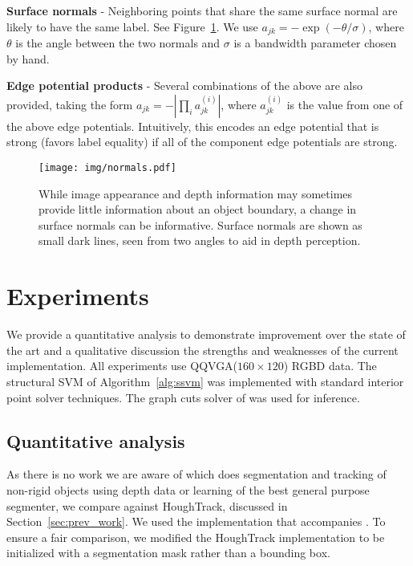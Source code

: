 \documentclass[graybox]{svmult}
\newcommand{\qqvga}{QQVGA\xspace}
\begin{document}
\textbf{Surface normals} - Neighboring points that share the same surface normal are likely to have the same label.  See Figure~\ref{fig:normals}. We use $a_{jk} = - \exp(-\theta / \sigma)$, where $\theta$ is the angle between the two normals and $\sigma$ is a bandwidth parameter chosen by hand.

\textbf{Edge potential products} - Several combinations of the above are also provided, taking the form $a_{jk} = -|\prod_i a^{(i)}_{jk}|$, where $a^{(i)}_{jk}$ is the value from one of the above edge potentials.  Intuitively, this encodes an edge potential that is strong (\ie favors label equality) if all of the component edge potentials are strong.

\begin{figure}
  \texttt{[image: img/normals.pdf]}
  \sidecaption[t]
  \caption{While image appearance and depth information may sometimes provide little information about an object boundary, a change in surface normals can be informative. Surface normals are shown as small dark lines, seen from two angles to aid in depth perception.}
  \label{fig:normals}
\end{figure}


\section{Experiments}

We provide a quantitative analysis to demonstrate improvement over the state of the art and a qualitative discussion the strengths and weaknesses of the current implementation.  All experiments use \qqvga (\ie $160 \times 120$) RGBD data.  The structural SVM of Algorithm~\ref{alg:ssvm} was implemented with standard interior point solver techniques.  The graph cuts solver of \cite{boykov2001a} was used for inference.


\subsection{Quantitative analysis}
\label{sec:quant}

As there is no work we are aware of which does segmentation and tracking of non-rigid objects using depth data or learning of the best general purpose segmenter, we compare against HoughTrack, discussed in Section~\ref{sec:prev_work}.  We used the implementation that accompanies \cite{godec2011a}.  To ensure a fair comparison, we modified the HoughTrack implementation to be initialized with a segmentation mask rather than a bounding box.
\end{document}
